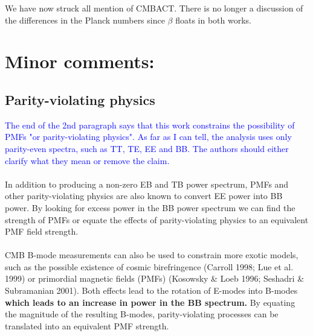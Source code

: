 \documentclass{article}
\newcommand{\reviewer}[1]{\textcolor{Blue}{#1}}
\newcommand{\diff}[1]{\textcolor{PineGreen}{#1}}
\begin{document}
We have now struck all mention of CMBACT. There is no longer a discussion of the differences in the Planck numbers since $\beta$ floats in both works.





\section{Minor comments:}
\subsection{Parity-violating physics}
\reviewer{The end of the 2nd paragraph says that this work constrains the possibility of PMFs "or parity-violating physics". As far as I can tell, the analysis uses only parity-even spectra, such as TT, TE, EE and BB. The authors should either clarify what they mean or remove the claim.}
\\\\

In addition to producing a non-zero EB and TB power spectrum, PMFs and other parity-violating physics are also known to convert EE power into BB power. By looking for excess power in the BB power spectrum we can find the strength of PMFs or equate the effects of parity-violating physics to an equivalent PMF field strength.\\\\

\diff{CMB B-mode measurements can also be used to constrain more exotic models, such as the possible existence of cosmic birefringence (Carroll 1998; Lue et al. 1999) or primordial magnetic fields (PMFs) (Kosowsky \& Loeb
1996; Seshadri \& Subramanian 2001).  
Both effects lead to the rotation of E-modes into B-modes \textbf{which leads to an increase in power in the BB spectrum.}
By equating the magnitude of the resulting B-modes, parity-violating processes can be translated into an equivalent PMF strength.}\\
\end{document}
